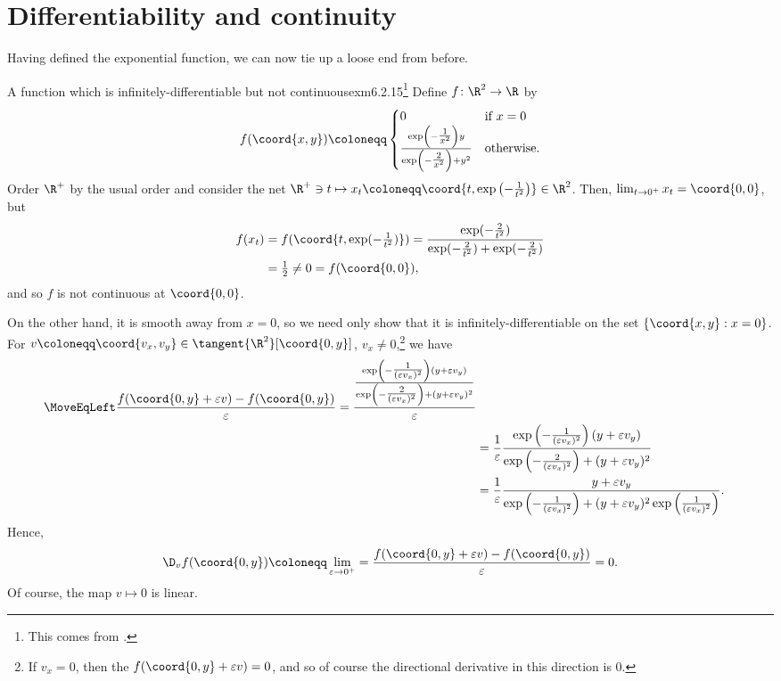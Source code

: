 \section{Differentiability and continuity}

Having defined the exponential function, we can now tie up a loose end from before.
\begin{exm}{A function which is infinitely-diff\-er\-en\-tia\-ble but not continuous}{exm6.2.15}\footnote{This comes from \cite[pg.~116]{Gelbaum}.}
Define $f\colon \R ^2\rightarrow \R$ by
\begin{equation}
f(\coord{x,y})\coloneqq \begin{cases}0 & \text{if }x=0 \\ \frac{\exp \left( -\tfrac{1}{x^2}\right) y}{\exp \left( -\tfrac{2}{x^2}\right) +y^2} & \text{otherwise.}\end{cases}
\end{equation}
Order $\R ^+$ by the usual order and consider the net $\R ^+\ni t\mapsto x_t\coloneqq \coord{t,\exp \left( -\frac{1}{t^2}\right) }\in \R ^2$.  Then, $\lim _{t\to 0^+}x_t=\coord{0,0}$, but
\begin{equation}
\begin{split}
f(x_t) & =f(\coord{t,\exp (-\tfrac{1}{t^2})})=\frac{\exp (-\tfrac{2}{t^2})}{\exp (-\tfrac{2}{t^2})+\exp (-\tfrac{2}{t^2})} \\
& =\tfrac{1}{2}\neq 0=f(\coord{0,0}),
\end{split}
\end{equation}
and so $f$ is not continuous at $\coord{0,0}$.

On the other hand, it is smooth away from $x=0$, so we need only show that it is infinitely-differentiable on the set $\{ \coord{x,y}:x=0\}$.  For $v\coloneqq \coord{v_x,v_y}\in \tangent{\R ^2}[\coord{0,y}]$, $v_x\neq 0$,\footnote{If $v_x=0$, then the $f(\coord{0,y}+\varepsilon v)=0$, and so of course the directional derivative in this direction is $0$.} we have
\begin{equation}
\begin{split}
\MoveEqLeft
\frac{f(\coord{0,y}+\varepsilon v)-f(\coord{0,y})}{\varepsilon}=\frac{\frac{\exp \left( -\tfrac{1}{(\varepsilon v_x)^2}\right) (y+\varepsilon v_y)}{\exp \left(-\tfrac{2}{(\varepsilon v_x)^2}\right) +(y+\varepsilon v_y)^2}}{\varepsilon} \\
& =\frac{1}{\varepsilon}\frac{\exp \left( -\tfrac{1}{(\varepsilon v_x)^2}\right) (y+\varepsilon v_y)}{\exp \left( -\tfrac{2}{(\varepsilon v_x)^2}\right) +(y+\varepsilon v_y)^2} \\
& =\frac{1}{\varepsilon}\frac{y+\varepsilon v_y}{\exp \left( -\tfrac{1}{(\varepsilon v_x)^2}\right) +(y+\varepsilon v_y)^2\exp \left( \tfrac{1}{(\varepsilon v_x)^2}\right) }.
\end{split}
\end{equation}
Hence,
\begin{equation}
\D _vf(\coord{0,y})\coloneqq \lim _{\varepsilon \to 0^+}=\frac{f(\coord{0,y}+\varepsilon v)-f(\coord{0,y})}{\varepsilon}=0.
\end{equation}
Of course, the map $v\mapsto 0$ is linear.


\end{exm}
